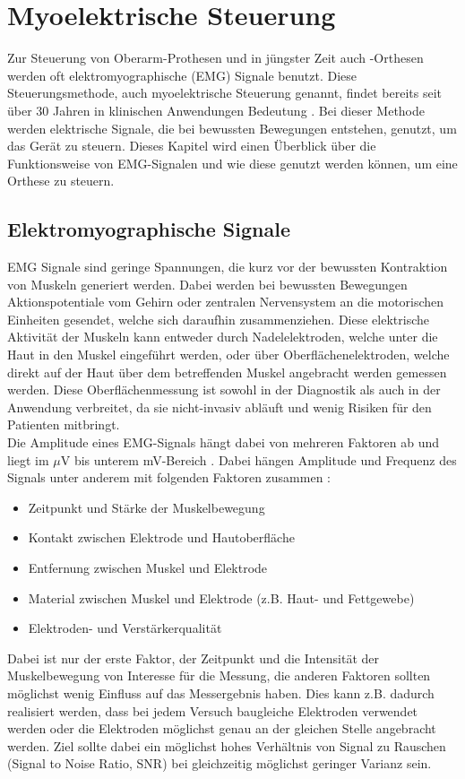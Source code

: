 \chapter{Myoelektrische Steuerung}
Zur Steuerung von Oberarm-Prothesen und in jüngster Zeit auch -Orthesen werden oft elektromyographische (EMG) Signale benutzt. Diese Steuerungsmethode, auch myoelektrische Steuerung genannt, findet bereits seit über 30 Jahren in klinischen Anwendungen Bedeutung \citep{Parker.2006}. Bei dieser Methode werden elektrische Signale, die bei bewussten Bewegungen entstehen, genutzt, um das Gerät zu steuern. Dieses Kapitel wird einen Überblick über die Funktionsweise von EMG-Signalen und wie diese genutzt werden können, um eine Orthese zu steuern.

\section{Elektromyographische Signale}
EMG Signale sind geringe Spannungen, die kurz vor der bewussten Kontraktion von Muskeln generiert werden. Dabei werden bei bewussten Bewegungen Aktionspotentiale vom Gehirn oder zentralen Nervensystem an die motorischen Einheiten gesendet, welche sich daraufhin zusammenziehen.  Diese elektrische Aktivität der Muskeln kann entweder durch Nadelelektroden, welche unter die Haut in den Muskel eingeführt werden, oder über Oberflächenelektroden, welche direkt auf der Haut über dem betreffenden Muskel angebracht werden gemessen werden. Diese Oberflächenmessung ist sowohl in der Diagnostik als auch in der Anwendung verbreitet, da sie nicht-invasiv abläuft und wenig Risiken für den Patienten mitbringt.\\

Die Amplitude eines EMG-Signals hängt dabei von mehreren Faktoren ab und liegt im $\mu$V bis unterem mV-Bereich \citep{Luca.2006}. Dabei hängen Amplitude und Frequenz des Signals unter anderem mit folgenden Faktoren zusammen \citep{Gerdle.2013}:
\begin{itemize}
	\item Zeitpunkt und Stärke der Muskelbewegung
	\item Kontakt zwischen Elektrode und Hautoberfläche
	\item Entfernung zwischen Muskel und Elektrode
	\item Material zwischen Muskel und Elektrode (z.B. Haut- und Fettgewebe)
	\item Elektroden- und Verstärkerqualität
\end{itemize}
Dabei ist nur der erste Faktor, der Zeitpunkt und die Intensität der Muskelbewegung von Interesse für die Messung, die anderen Faktoren sollten möglichst wenig Einfluss auf das Messergebnis haben. Dies kann z.B. dadurch realisiert werden, dass bei jedem Versuch baugleiche Elektroden verwendet werden oder die Elektroden möglichst genau an der gleichen Stelle angebracht werden. Ziel sollte dabei ein möglichst hohes Verhältnis von Signal zu Rauschen (Signal to Noise Ratio, SNR) bei gleichzeitig möglichst geringer Varianz sein. \\

